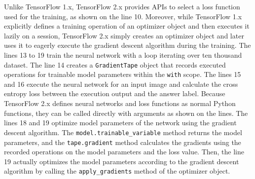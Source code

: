 Unlike TensorFlow 1.x, TensorFlow 2.x provides APIs to select a loss function
used for the training, as shown on the line 10.
Moreover, while TensorFlow 1.x explicitly defines a training operation of an
optimizer object and then executes it lazily on a session, TensorFlow 2.x
simply creates an optimizer object and later uses it to eagerly execute the
gradient descent algorithm during the training.
The lines 13 to 19 train the neural network with a loop iterating over ten
thousand dataset.
The line 14 creates a {\tt GradientTape} object that records executed
operations for trainable model parameters within the {\tt with} scope.  
The lines 15 and 16 execute the neural network for an input image and calculate
the cross entropy loss between the execution output and the answer label. 
Because TensorFlow 2.x defines neural networks and loss functions as normal
Python functions, they can be called directly with arguments as shown on the
lines.
The lines 18 and 19 optimize model parameters of the network using the gradient
descent algorithm. 
The {\tt model.trainable\_variable} method returns the model parameters, and
the {\tt tape.gradient} method calculates the gradients using the recorded
operations on the model parameters and the loss value.
Then, the line 19 actually optimizes the model parameters according to the
gradient descent algorithm by calling the {\tt apply\_gradients} method of the
optimizer object.


